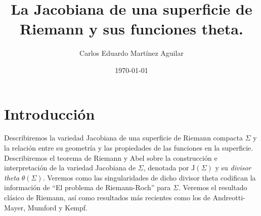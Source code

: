 \documentclass[letterpaper]{article}
\author{Carlos Eduardo Martínez Aguilar}
\date{\today}
\title{La Jacobiana de una superficie de Riemann y sus funciones theta.}
\newcommand{\sig}{\ensuremath{\Sigma}}
\begin{document}
\maketitle
\tableofcontents


\section{Introducción}
\noindent Describiremos la variedad Jacobiana de una superficie de Riemann compacta \(\sig\) y la relación entre su geometría y las propiedades de las funciones en la superficie. Describiremos el teorema de Riemann y Abel sobre la construcción e interpretación de la variedad Jacobiana de \(\sig\), denotada por \(\mathrm{J}(\sig)\) y su \emph{divisor theta} \(\theta(\sig)\). Veremos como las singularidades de dicho divisor theta codifican la información de ``El problema de Riemann-Roch'' para \(\sig\). Veremos el resultado clásico de Riemann, así como resultados más recientes como los de Andreotti-Mayer, Mumford y Kempf.
\end{document}
